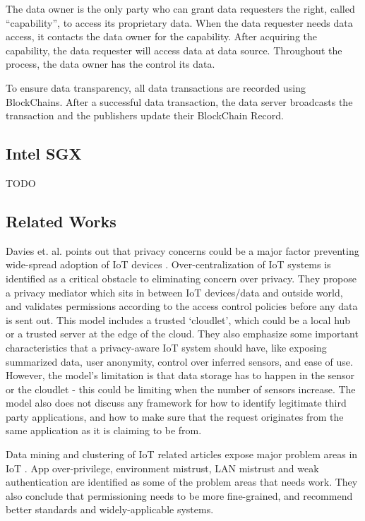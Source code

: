 The data owner is the only party who can grant data requesters the right, called “capability”, to access its proprietary data. When the data requester needs data access, it contacts the data owner for the capability. After acquiring the capability, the data requester will access data at data source. Throughout the process, the data owner has the control its data.

To ensure data transparency, all data transactions are recorded using BlockChains. After a successful data transaction, the data server broadcasts the transaction and the publishers update their BlockChain Record. 

\subsection{Intel SGX}
TODO

\subsection{Related Works}
Davies et. al. points out that privacy concerns could be a major factor preventing wide-spread adoption of IoT devices \cite{davies}. Over-centralization of IoT systems is identified as a critical obstacle to eliminating concern over privacy. They propose a privacy mediator which sits in between IoT devices/data and outside world, and validates permissions according to the access control policies before any data is sent out. This model includes a trusted `cloudlet', which could be a local hub or a trusted server at the edge of the cloud. They also emphasize some important characteristics that a privacy-aware IoT system should have, like exposing summarized data, user anonymity, control over inferred sensors, and ease of use. However, the model's limitation is that data storage has to happen in the sensor or the cloudlet - this could be limiting when the number of sensors increase. The model also does not discuss any framework for how to identify legitimate third party applications, and how to make sure that the request originates from the same application as it is claiming to be from.

Data mining and clustering of IoT related articles expose major problem areas in IoT \cite{zhang}. App over-privilege, environment mistrust, LAN mistrust and weak authentication are identified as some of the problem areas that needs work. They also conclude that permissioning needs to be more fine-grained, and recommend better standards and widely-applicable systems.
